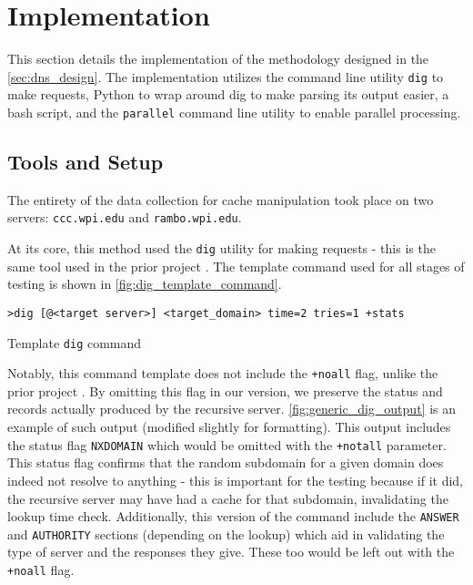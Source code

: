 \section{Implementation}\label{sec:dns_impl} %

This section details the implementation of the methodology designed in the \cref{sec:dns_design}. The implementation utilizes the command line utility \texttt{dig} to make \dns requests, Python to wrap around dig to make parsing its output easier, a bash script, and the \texttt{parallel} command line utility to enable parallel processing.

\subsection{Tools and Setup}

The entirety of the data collection for \dns cache manipulation took place on two \wpi servers: \texttt{ccc.wpi.edu} and \texttt{rambo.wpi.edu}.

At its core, this method used the \texttt{dig} utility for making \dns requests - this is the same tool used in the prior project \cite{Fakult2019}. The template command used for all stages of testing is shown in \cref{fig:dig_template_command}.

\begin{code}[h]
    \centering
    \begin{verbatim}
>dig [@<target server>] <target_domain> time=2 tries=1 +stats
    \end{verbatim}
    \caption{Template \texttt{dig} command}
    \label{fig:dig_template_command}
\end{code}

Notably, this command template does not include the \texttt{+noall} flag, unlike the prior project \cite{Fakult2019}. By omitting this flag in our version, we preserve the status and records actually produced by the recursive \dns server. \cref{fig:generic_dig_output} is an example of such output (modified slightly for formatting). This output includes the status flag \texttt{NXDOMAIN} which would be omitted with the \texttt{+notall} parameter. This status flag confirms that the random subdomain for a given domain does indeed not resolve to anything - this is important for the testing because if it did, the recursive server may have had a cache for that subdomain, invalidating the lookup time check. Additionally, this version of the command include the \texttt{ANSWER} and \texttt{AUTHORITY} sections (depending on the lookup) which aid in validating the type of server and the responses they give. These too would be left out with the \texttt{+noall} flag.

